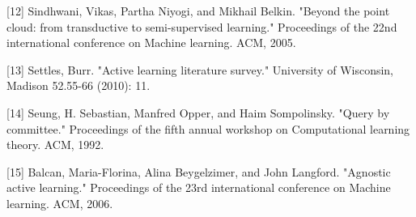 \documentclass{article}
\begin{document}
[12] Sindhwani, Vikas, Partha Niyogi, and Mikhail Belkin. "Beyond the point cloud: from transductive to semi-supervised learning." Proceedings of the 22nd international conference on Machine learning. ACM, 2005.

[13] Settles, Burr. "Active learning literature survey." University of Wisconsin, Madison 52.55-66 (2010): 11.

[14] Seung, H. Sebastian, Manfred Opper, and Haim Sompolinsky. "Query by committee." Proceedings of the fifth annual workshop on Computational learning theory. ACM, 1992.

[15] Balcan, Maria-Florina, Alina Beygelzimer, and John Langford. "Agnostic active learning." Proceedings of the 23rd international conference on Machine learning. ACM, 2006.
\end{document}
